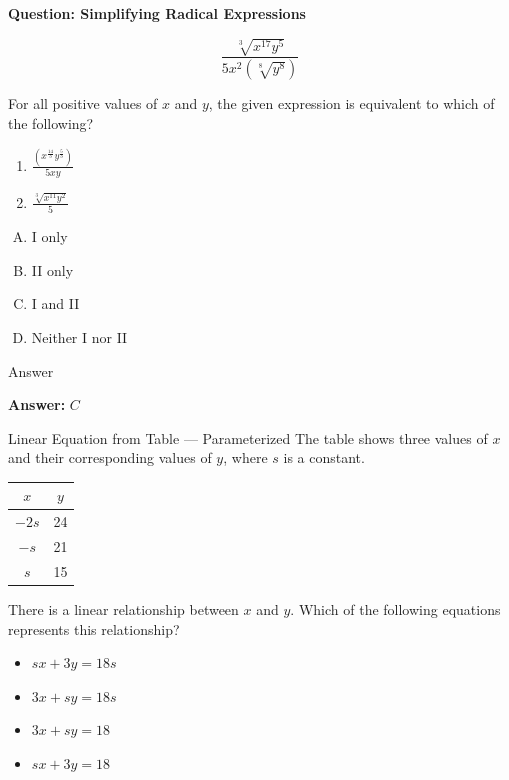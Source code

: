 \documentclass{beamer}
\begin{document}
\begin{frame}{\textbf{Question: Simplifying Radical Expressions}}

\[
\frac{\sqrt[3]{x^{17} y^5}}{5x^2 \left( \sqrt[8]{y^8} \right)}
\]

For all positive values of \( x \) and \( y \), the given expression is equivalent to which of the following?

\begin{enumerate}
    \item \( \frac{\left( x^{\frac{14}{3}} y^{\frac{5}{3}} \right)}{5xy} \)
    \item \( \frac{\sqrt[3]{x^{11} y^2}}{5} \)
\end{enumerate}

\begin{enumerate}[(A)]
    \item I only
    \item II only
    \item I and II
    \item Neither I nor II
\end{enumerate}

\end{frame}



\begin{frame}{Answer}


\textbf{Answer:} \( \boxed{C} \)
\end{frame}


\begin{frame}{Linear Equation from Table — Parameterized}
    The table shows three values of \(x\) and their corresponding values of \(y\), where \(s\) is a constant.

    \vspace{1em}
    \begin{center}
    \begin{tabular}{|c|c|}
        \hline
        \(x\) & \(y\) \\
        \hline
        \(-2s\) & 24 \\
        \(-s\) & 21 \\
        \(s\) & 15 \\
        \hline
    \end{tabular}
    \end{center}

    \vspace{1em}
    There is a linear relationship between \(x\) and \(y\).  
    Which of the following equations represents this relationship?

    \begin{itemize}
        \item[\textbf{A.}] \(sx + 3y = 18s\)
        \item[\textbf{B.}] \(3x + sy = 18s\)
        \item[\textbf{C.}] \(3x + sy = 18\)
        \item[\textbf{D.}] \(sx + 3y = 18\)
    \end{itemize}
\end{frame}
\end{document}
